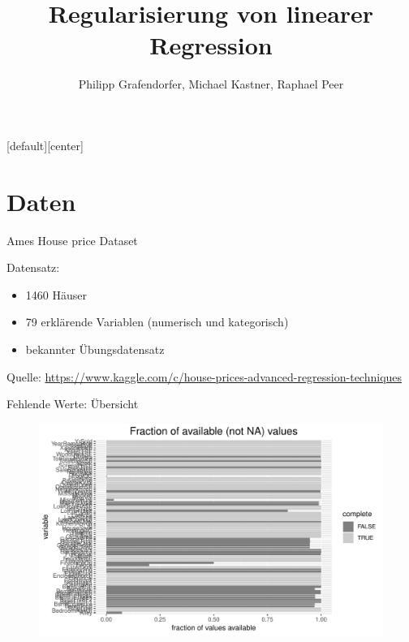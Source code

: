 \documentclass[10pt]{beamer}
\title{Regularisierung von linearer Regression}
\date{}
\author{Philipp Grafendorfer, Michael Kastner, Raphael Peer}
\begin{document}
[default][center]

\maketitle

\section{Daten}


\begin{frame}{Ames House price Dataset}
	
	\begin{Large}
		Datensatz:
	\end{Large}
	\begin{itemize}
		\item 1460 Häuser
		\item 79 erklärende Variablen (numerisch und kategorisch)
		\item bekannter Übungsdatensatz
	\end{itemize}
	
	\begin{Tiny}		
		Quelle: \url{https://www.kaggle.com/c/house-prices-advanced-regression-techniques}
	\end{Tiny}
\end{frame}


\begin{frame}{Fehlende Werte: Übersicht}
	
	\begin{figure}
		\includegraphics[width=\textwidth, keepaspectratio]{figures/na_stats}
	\end{figure}
	
\end{frame}
\end{document}
